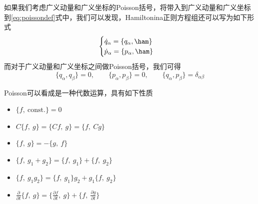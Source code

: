 如果我们考虑广义动量和广义坐标的Poisson括号，将带入到广义动量和广义坐标到\eqref{eq:poissondef}式中，我们可以发现，Hamiltonina正则方程组还可以写为如下形式
\begin{equation}
    \begin{cases}
        \dot q_\alpha = \{ q_\alpha,\ham\}\\
        \dot p_\alpha = \{p_\alpha, \ham \}
    \end{cases}
\end{equation}
而对于广义动量和广义坐标之间做Poisson括号，我们可得
\begin{equation}
    \{ q_\alpha, q_\beta\}=0,\qquad\{ p_\alpha, p_\beta\}=0,\qquad \{ q_\alpha, p_\beta\} = \delta_{\alpha\beta}
\end{equation}

Poisson可以看成是一种代数运算，具有如下性质
\begin{itemize}
    \item [i.] $\{f,~\mathrm{const.}\}=0$
    \item [ii.] $C\{f,~g\}=\{Cf,~g\} = \{f,~Cg\}$
    \item [iii.] $\{f,~g\}=-\{g,~f\}$
    \item [iv.] $\{f,~g_1+g_2\}=\{f,~g_1\}+\{f,~g_2\}$
    \item [v.] $\{f,~g_1 g_2\} = \{f,~g_1\}g_2 + g_1 \{f,~g_2\}$
    \item [vi.] $\frac{\partial }{\partial t}\{f,~g\} = \{\frac{\partial f}{\partial t},~g\} + \{f,~\frac{\partial g}{\partial t}\}$
\end{itemize}


